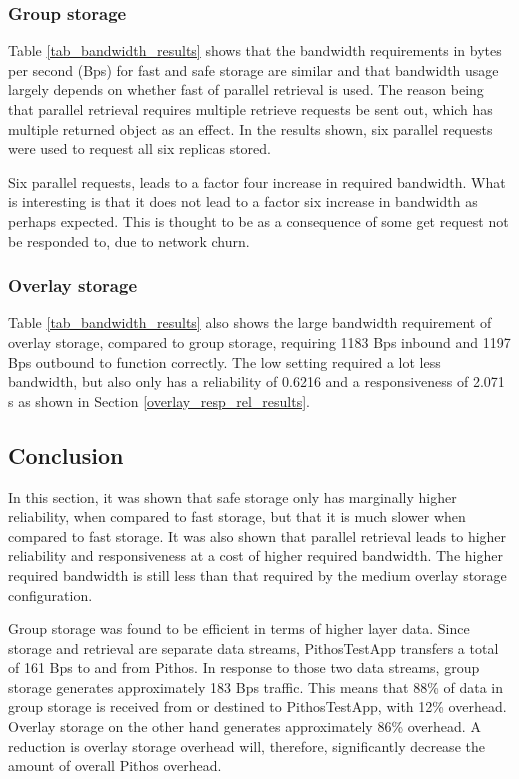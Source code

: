\subsubsection{Group storage}
Table \ref{tab_bandwidth_results} shows that the bandwidth requirements in bytes per second (Bps) for fast and safe storage are similar and that bandwidth usage largely depends on whether fast of parallel retrieval is used. The reason being that parallel retrieval requires multiple retrieve requests be sent out, which has multiple returned object as an effect. In the results shown, six parallel requests were used to request all six replicas stored.

Six parallel requests, leads to a factor four increase in required bandwidth. What is interesting is that it does not lead to a factor six increase in bandwidth as perhaps expected. This is thought to be as a consequence of some get request not be responded to, due to network churn.

\subsubsection{Overlay storage}
Table \ref{tab_bandwidth_results} also shows the large bandwidth requirement of overlay storage, compared to group storage, requiring 1183 Bps inbound and 1197 Bps outbound to function correctly. The low setting required a lot less bandwidth, but also only has a reliability of 0.6216 and a responsiveness of 2.071 s as shown in Section \ref{overlay_resp_rel_results}.

\subsection{Conclusion}

In this section, it was shown that safe storage only has marginally higher reliability, when compared to fast storage, but that it is much slower when compared to fast storage. It was also shown that parallel retrieval leads to higher reliability and responsiveness at a cost of higher required bandwidth. The higher required bandwidth is still less than that required by the medium overlay storage configuration.

Group storage was found to be efficient in terms of higher layer data. Since storage and retrieval are separate data streams, PithosTestApp transfers a total of 161 Bps to and from Pithos. In response to those two data streams, group storage generates approximately 183 Bps traffic. This means that 88\% of data in group storage is received from or destined to PithosTestApp, with 12\% overhead. Overlay storage on the other hand generates approximately 86\% overhead. A reduction is overlay storage overhead will, therefore, significantly decrease the amount of overall Pithos overhead.

